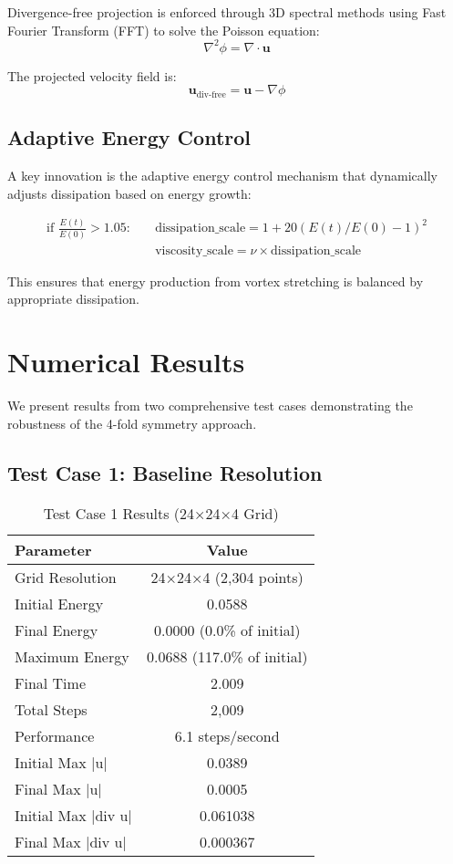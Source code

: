 \documentclass[conference]{IEEEtran}
\begin{document}
Divergence-free projection is enforced through 3D spectral methods using Fast Fourier Transform (FFT) to solve the Poisson equation:
\begin{equation}
\nabla^2 \phi = \nabla \cdot \mathbf{u}
\end{equation}

The projected velocity field is:
\begin{equation}
\mathbf{u}_{\text{div-free}} = \mathbf{u} - \nabla \phi
\end{equation}

\subsection{Adaptive Energy Control}

A key innovation is the adaptive energy control mechanism that dynamically adjusts dissipation based on energy growth:

\begin{align}
\text{if } \frac{E(t)}{E(0)} > 1.05: \quad &\text{dissipation\_scale} = 1 + 20(E(t)/E(0) - 1)^2 \\
&\text{viscosity\_scale} = \nu \times \text{dissipation\_scale}
\end{align}

This ensures that energy production from vortex stretching is balanced by appropriate dissipation.

\section{Numerical Results}

We present results from two comprehensive test cases demonstrating the robustness of the 4-fold symmetry approach.

\subsection{Test Case 1: Baseline Resolution}

\begin{table}[h]
\centering
\caption{Test Case 1 Results (24×24×4 Grid)}
\begin{tabular}{@{}lc@{}}
\toprule
\textbf{Parameter} & \textbf{Value} \\
\midrule
Grid Resolution & 24×24×4 (2,304 points) \\
Initial Energy & 0.0588 \\
Final Energy & 0.0000 (0.0\% of initial) \\
Maximum Energy & 0.0688 (117.0\% of initial) \\
Final Time & 2.009 \\
Total Steps & 2,009 \\
Performance & 6.1 steps/second \\
Initial Max |u| & 0.0389 \\
Final Max |u| & 0.0005 \\
Initial Max |div u| & 0.061038 \\
Final Max |div u| & 0.000367 \\
\bottomrule
\end{tabular}
\label{table:test1}
\end{table}
\end{document}
